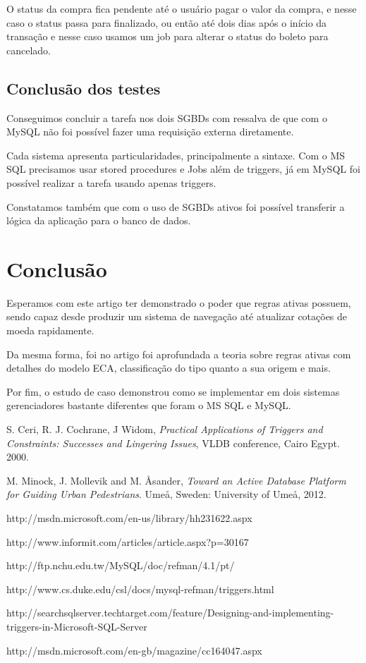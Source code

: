 \documentclass[conference]{IEEEtran}
\begin{document}
    O status da compra fica pendente até o usuário pagar o valor da compra, e nesse caso o status passa para finalizado, ou então até dois dias após o início da transação e nesse caso usamos um job para alterar o status do boleto para cancelado.

  \subsection{Conclusão dos testes}
  Conseguimos concluir a tarefa nos dois SGBDs com ressalva de que com o MySQL não foi possível fazer uma requisição externa diretamente.

	Cada sistema apresenta particularidades, principalmente a sintaxe. Com o MS SQL precisamos usar stored procedures e Jobs além de triggers, já em MySQL foi possível realizar a tarefa usando apenas triggers.

	Constatamos também que com o uso de SGBDs ativos foi possível transferir a lógica da aplicação para o banco de dados.

\section{Conclusão}
Esperamos com este artigo ter demonstrado o poder que regras ativas possuem, sendo capaz desde produzir um sistema de navegação até atualizar cotações de moeda rapidamente.

Da mesma forma, foi no artigo foi aprofundada a teoria sobre regras ativas com detalhes do modelo ECA, classificação do tipo quanto a sua origem e mais.

Por fim, o estudo de caso demonstrou como se implementar em dois sistemas gerenciadores bastante diferentes que foram o MS SQL e MySQL.

\begin{thebibliography}{1}

  S. Ceri, R. J. Cochrane, J Widom, \textit{Practical Applications of Triggers and Constraints: Successes and Lingering Issues}, VLDB conference, Cairo Egypt. 2000.

  M. Minock, J. Mollevik and M. \r{A}sander, \textit{Toward an Active Database Platform for Guiding Urban Pedestrians}. Ume\r{a}, Sweden: University of Ume\r{a}, 2012.

http://msdn.microsoft.com/en-us/library/hh231622.aspx
  
http://www.informit.com/articles/article.aspx?p=30167

  http://ftp.nchu.edu.tw/MySQL/doc/refman/4.1/pt/

  http://www.cs.duke.edu/csl/docs/mysql-refman/triggers.html

http://searchsqlserver.techtarget.com/feature/Designing-and-implementing-triggers-in-Microsoft-SQL-Server

http://msdn.microsoft.com/en-gb/magazine/cc164047.aspx


\end{thebibliography}
\end{document}

